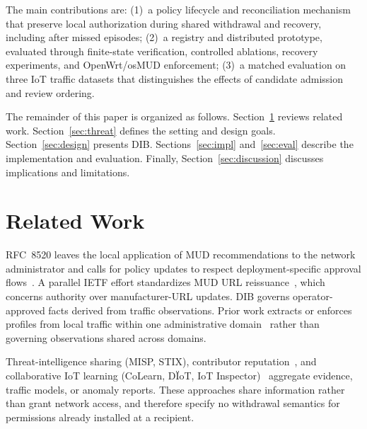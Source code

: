 \documentclass[journal]{IEEEtran}
\theoremstyle{definition}
\begin{document}
The main contributions are: (1)~a policy lifecycle and reconciliation mechanism that preserve local authorization during shared withdrawal and recovery, including after missed episodes; (2)~a registry and distributed prototype, evaluated through finite-state verification, controlled ablations, recovery experiments, and OpenWrt/osMUD enforcement; (3)~a matched evaluation on three IoT traffic datasets that distinguishes the effects of candidate admission and review ordering.

The remainder of this paper is organized as follows. Section~\ref{sec:related-work} reviews related work. Section~\ref{sec:threat} defines the setting and design goals. Section~\ref{sec:design} presents DIB. Sections~\ref{sec:impl} and~\ref{sec:eval} describe the implementation and evaluation. Finally, Section~\ref{sec:discussion} discusses implications and limitations.

\section{Related Work}
\label{sec:related-work}
RFC~8520 leaves the local application of MUD recommendations to the network administrator and calls for policy updates to respect deployment-specific approval flows~\cite[Secs.~1.1 and~1.8]{rfc8520}. A parallel IETF effort standardizes MUD URL reissuance~\cite{mudacceptableurls}, which concerns authority over manufacturer-URL updates. DIB governs operator-approved facts derived from traffic observations. Prior work extracts or enforces profiles from local traffic within one administrative domain~\cite{clearasmud,hamzatdsc,mudflow,CornoMannella2023GatewayMUD,osmud,mudscope} rather than governing observations shared across domains.

Threat-intelligence sharing (MISP, STIX), contributor reputation~\cite{wagner2016misp,stix21,eigentrust,trustsurvey}, and collaborative IoT learning (CoLearn, D\"IoT, IoT Inspector)~\cite{colearn,ndiot2019,iotinspector,vasilomanolakis2015collaborative} aggregate evidence, traffic models, or anomaly reports. These approaches share information rather than grant network access, and therefore specify no withdrawal semantics for permissions already installed at a recipient.
\end{document}
